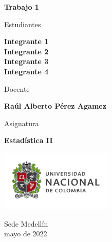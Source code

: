 \begin{titlepage}
   \Large{
   \begin{center}
       \vspace*{1cm}

       \textbf{Trabajo 1}

            
       \vspace{1.5cm}
       
       Estudiantes
       
       \vspace{0.5cm}
        
	  \textbf{Integrante 1} \\        

    \textbf{Integrante 2} \\
    
    \textbf{Integrante 3} \\
    
    \textbf{Integrante 4} \\

              \vspace{1cm}
       
       Docente
       
       \vspace{0.5cm}

       \textbf{Raúl Alberto Pérez Agamez}
       
       \vspace{0.4cm}

       \vspace{1.4cm}
       
       Asignatura
       
       \vspace{0.5cm}

       \textbf{Estadística II}

       \vfill

            
       \vspace{0.4cm}
     
       \includegraphics[width=0.4\textwidth]{logounal.png}
            
       Sede Medellín\\
       mayo de 2022
       
   \end{center}
   }
\end{titlepage}